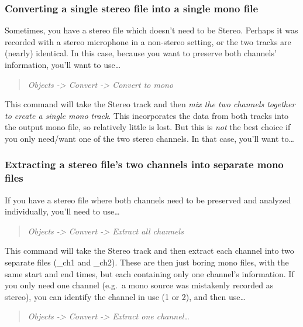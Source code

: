\documentclass[11pt]{article}
\begin{document}
\hypertarget{converting-a-single-stereo-file-into-a-single-mono-file}{%
\subsubsection{Converting a single stereo file into a single mono
file}\label{converting-a-single-stereo-file-into-a-single-mono-file}}

Sometimes, you have a stereo file which doesn't need to be Stereo.
Perhaps it was recorded with a stereo microphone in a non-stereo
setting, or the two tracks are (nearly) identical. In this case, because
you want to preserve both channels' information, you'll want to
use\ldots{}

\begin{quote}
\emph{Objects -\textgreater{} Convert -\textgreater{} Convert to mono}
\end{quote}

This command will take the Stereo track and then \emph{mix the two
channels together to create a single mono track}. This incorporates the
data from both tracks into the output mono file, so relatively little is
lost. But this is \emph{not} the best choice if you only need/want one
of the two stereo channels. In that case, you'll want to\ldots{}

\hypertarget{extracting-a-stereo-files-two-channels-into-separate-mono-files}{%
\subsubsection{Extracting a stereo file's two channels into separate
mono
files}\label{extracting-a-stereo-files-two-channels-into-separate-mono-files}}

If you have a stereo file where both channels need to be preserved and
analyzed individually, you'll need to use\ldots{}

\begin{quote}
\emph{Objects -\textgreater{} Convert -\textgreater{} Extract all
channels}
\end{quote}

This command will take the Stereo track and then extract each channel
into two separate files (\_ch1 and \_ch2). These are then just boring
mono files, with the same start and end times, but each containing only
one channel's information. If you only need one channel (e.g.~a mono
source was mistakenly recorded as stereo), you can identify the channel
in use (1 or 2), and then use\ldots{}

\begin{quote}
\emph{Objects -\textgreater{} Convert -\textgreater{} Extract one
channel\ldots{}}
\end{quote}
\end{document}
